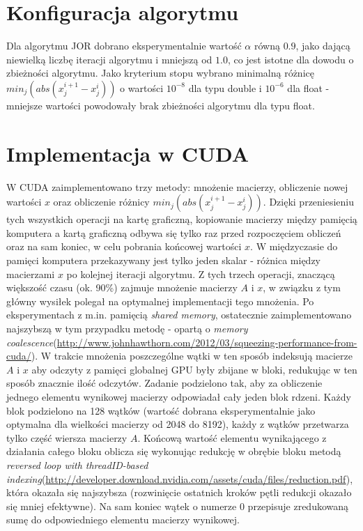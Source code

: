 \documentclass[11pt,a4paper]{article}
\begin{document}
\section{Konfiguracja algorytmu}
Dla algorytmu JOR dobrano eksperymentalnie wartość $\alpha$ równą $0.9$, jako dającą niewielką liczbę iteracji algorytmu i mniejszą od $1.0$, co jest istotne dla dowodu o zbieżności algorytmu. Jako kryterium stopu wybrano minimalną różnicę $min_j(abs(x_j^{i+1} - x_j^{i}))$ o wartości $10^{-8}$ dla typu double i $10^{-6}$ dla float - mniejsze wartości powodowały brak zbieżności algorytmu dla typu float.

\section{Implementacja w CUDA}
W CUDA zaimplementowano trzy metody: mnożenie macierzy, obliczenie nowej wartości $x$ oraz obliczenie różnicy  $min_j(abs(x_j^{i+1} - x_j^{i}))$. Dzięki przeniesieniu tych wszystkich operacji na kartę graficzną, kopiowanie macierzy między pamięcią komputera a kartą graficzną odbywa się tylko raz przed rozpoczęciem obliczeń oraz na sam koniec, w celu pobrania końcowej wartości $x$. W międzyczasie do pamięci komputera przekazywany jest tylko jeden skalar - różnica między macierzami $x$ po kolejnej iteracji algorytmu. Z tych trzech operacji, znaczącą większość czasu (ok. 90\%) zajmuje mnożenie macierzy $A$ i $x$, w związku z tym główny wysiłek polegał na optymalnej implementacji tego mnożenia. Po eksperymentach z m.in. pamięcią \emph{shared memory}, ostatecznie zaimplementowano najszybszą w tym przypadku metodę - opartą o \emph{memory coalescence}(\url{http://www.johnhawthorn.com/2012/03/squeezing-performance-from-cuda/}). W trakcie mnożenia poszczególne wątki w ten sposób indeksują macierze $A$ i $x$ aby odczyty z pamięci globalnej GPU były zbijane w bloki, redukując w ten sposób znacznie ilość odczytów. Zadanie podzielono tak, aby za obliczenie jednego elementu wynikowej macierzy odpowiadał cały jeden blok rdzeni. Każdy blok podzielono na 128 wątków (wartość dobrana eksperymentalnie jako optymalna dla wielkości macierzy od 2048 do 8192), każdy z wątków przetwarza tylko część wiersza macierzy $A$. Końcową wartość elementu wynikającego z działania całego bloku oblicza się wykonując redukcję w obrębie bloku metodą \emph{reversed loop with threadID-based indexing}(\url{http://developer.download.nvidia.com/assets/cuda/files/reduction.pdf}), która okazała się najszybsza (rozwinięcie ostatnich kroków pętli redukcji okazało się mniej efektywne). Na sam koniec wątek o numerze 0 przepisuje zredukowaną sumę do odpowiedniego elementu macierzy wynikowej.
\end{document}
